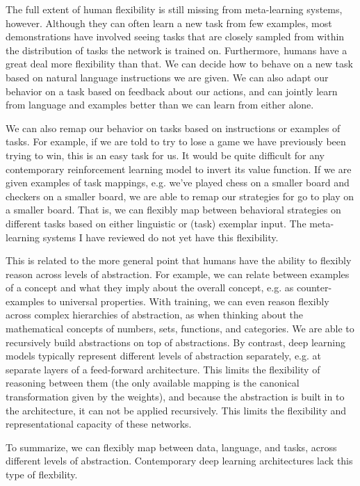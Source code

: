 \documentclass[11pt]{article}
\begin{document}
The full extent of human flexibility is still missing from meta-learning systems, however. Although they can often learn a new task from few examples, most demonstrations have involved seeing tasks that are closely sampled from within the distribution of tasks the network is trained on. Furthermore, humans have a great deal more flexibility than that. We can decide how to behave on a new task based on natural language instructions we are given. We can also adapt our behavior on a task based on feedback about our actions, and can jointly learn from language and examples better than we can learn from either alone. \par
We can also remap our behavior on tasks based on instructions or examples of tasks. For example, if we are told to try to lose a game we have previously been trying to win, this is an easy task for us. It would be quite difficult for any contemporary reinforcement learning model to invert its value function. If we are given examples of task mappings, e.g. we've played chess on a smaller board and checkers on a smaller board, we are able to remap our strategies for go to play on a smaller board. That is, we can flexibly map between behavioral strategies on different tasks based on either linguistic or (task) exemplar input. The meta-learning systems I have reviewed do not yet have this flexibility. \par
This is related to the more general point that humans have the ability to flexibly reason across levels of abstraction. For example, we can relate between examples of a concept and what they imply about the overall concept, e.g. as counter-examples to universal properties. With training, we can even reason flexibly across complex hierarchies of abstraction, as when thinking about the mathematical concepts of numbers, sets, functions, and categories. We are able to recursively build abstractions on top of abstractions. By contrast, deep learning models typically represent different levels of abstraction separately, e.g. at separate layers of a feed-forward architecture. This limits the flexibility of reasoning between them (the only available mapping is the canonical transformation given by the weights), and because the abstraction is built in to the architecture, it can not be applied recursively. This limits the flexibility and representational capacity of these networks. \par 
To summarize, we can flexibly map between data, language, and tasks, across different levels of abstraction. Contemporary deep learning architectures lack this type of flexbility. 
\end{document}
